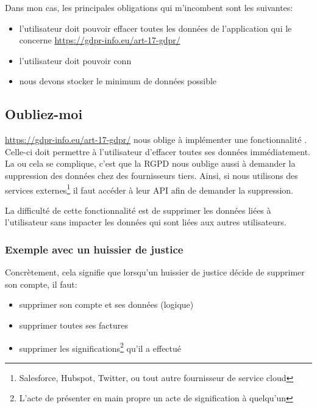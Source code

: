 \documentclass[]{report}
\begin{document}

    Dans mon cas, les principales obligations qui m'incombent sont les suivantes:

    \begin{itemize}
      \item l'utilisateur doit pouvoir effacer toutes les données de l'application qui le concerne \href{Chapitre 3, Article 17}{https://gdpr-info.eu/art-17-gdpr/}
      \item l'utilisateur doit pouvoir conn
      \item nous devons stocker le minimum de données possible
    \end{itemize}


    \subsection{Oubliez-moi}\label{subsec:forget-me}

      \href{L'article 17 de la RGPD}{https://gdpr-info.eu/art-17-gdpr/} nous oblige à implémenter une fonctionnalité . Celle-ci doit permettre à l'utilisateur d'effacer toutes ses données immédiatement. La ou cela se complique, c'est que la RGPD nous oublige aussi à demander la suppression des données chez des fournisseurs tiers. Ainsi, si nous utilisons des services externes\footnote{Salesforce, Hubspot, Twitter, ou tout autre fournisseur de service cloud} il faut accéder à leur API afin de demander la suppression.

      La difficulté de cette fonctionnalité est de supprimer les données liées à l'utilisateur sans impacter les données qui sont liées aux autres utilisateurs.

      \subsubsection{Exemple avec un huissier de justice}

        Concrètement, cela signifie que lorsqu'un huissier de justice décide de supprimer son compte, il faut:

        \begin{itemize}
          \item supprimer son compte et ses données (logique)
          \item supprimer toutes ses factures
          \item supprimer les significations\footnote{L'acte de présenter en main propre un acte de signification à quelqu'un} qu'il a effectué
        \end{itemize}
\end{document}
